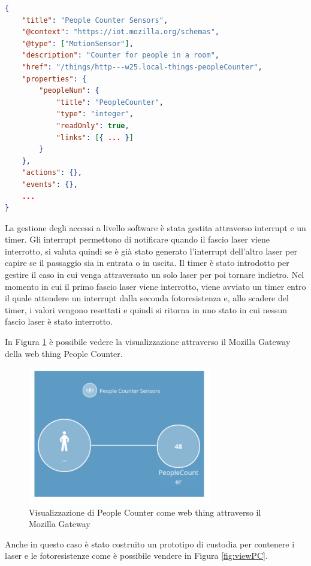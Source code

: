 \documentclass{article}
\begin{document}
\bigskip
\begin{lstlisting}[language=json,firstnumber=1]
{
    "title": "People Counter Sensors",
    "@context": "https://iot.mozilla.org/schemas",
    "@type": ["MotionSensor"],
    "description": "Counter for people in a room",
    "href": "/things/http---w25.local-things-peopleCounter",
    "properties": {
        "peopleNum": {
            "title": "PeopleCounter",
            "type": "integer",
            "readOnly": true,
            "links": [{ ... }]
        }
    },
    "actions": {},
    "events": {},
    ...
}
\end{lstlisting}
\bigskip

La gestione degli accessi a livello software è stata gestita attraverso interrupt e un timer. Gli interrupt permettono di notificare quando il fascio laser viene interrotto, si valuta quindi se è già stato generato l'interrupt dell'altro laser per capire se il passaggio sia in entrata o in uscita. Il timer è stato introdotto per gestire il caso in cui venga attraversato un solo laser per poi tornare indietro. Nel momento in cui il primo fascio laser viene interrotto, viene avviato un timer entro il quale attendere un interrupt dalla seconda fotoresistenza e, allo scadere del timer, i valori vengono resettati e quindi si ritorna in uno stato in cui nessun fascio laser è stato interrotto.

In Figura \ref{fig:webthingPC} è possibile vedere la visualizzazione attraverso il Mozilla Gateway della web thing People Counter.

\begin{figure}
    \centering
    \includegraphics[width=8cm]{img/PeopleCounter.png}
    \caption{Visualizzazione di People Counter come web thing attraverso il Mozilla Gateway}
    \label{fig:webthingPC}
\end{figure}


Anche in questo caso è stato costruito un prototipo di custodia per contenere i laser e le fotoresistenze come è possibile vendere in Figura \ref{fig:viewPC}.
\end{document}
